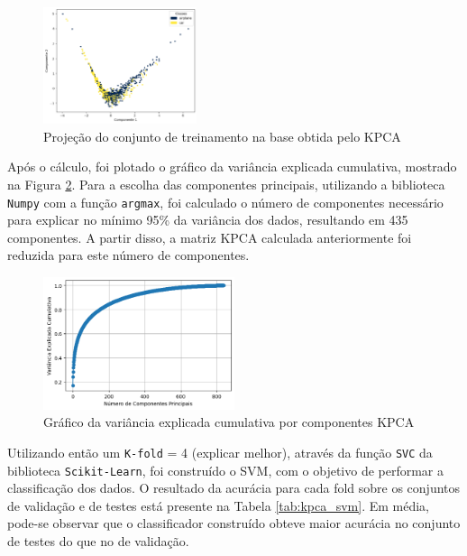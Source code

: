 \documentclass[]{abntex2}
\begin{document}
\begin{figure}[H]
    \centering 
    \includegraphics[width=0.4\textwidth]{imgs/ex1/KPCA.png}
    \caption{Projeção do conjunto de treinamento na base obtida pelo KPCA}
    \label{fig:KPCA} %
\end{figure}

Após o cálculo, foi plotado o gráfico da {\color{red}variância explicada cumulativa}, mostrado na Figura \ref{fig:vari_kpca}. Para a escolha das componentes principais, utilizando a biblioteca \texttt{Numpy} com a função \texttt{argmax}, foi calculado o número de componentes necessário para explicar no mínimo 95\% da variância dos dados, resultando em 435 componentes. A partir disso, a matriz KPCA calculada anteriormente foi reduzida para este número de componentes.

\begin{figure}[H]
    \centering 
    \includegraphics[width=0.5\textwidth]{imgs/ex1/vari_kpca.png}
    \caption{Gráfico da variância explicada cumulativa por componentes KPCA}
    \label{fig:vari_kpca} %
\end{figure}

Utilizando então um \texttt{K-fold} = 4 {\color{red}(explicar melhor)}, através da função \texttt{SVC} da biblioteca \texttt{Scikit-Learn}, foi construído o SVM, com o objetivo de performar a classificação dos dados. O resultado da acurácia para cada fold sobre os conjuntos de validação e de testes está presente na Tabela \ref{tab:kpca_svm}. Em média, pode-se observar que o classificador construído obteve maior acurácia no conjunto de testes do que no de validação.
\end{document}
